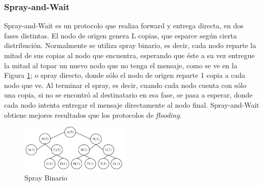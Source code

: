 \subsubsection{Spray-and-Wait}
Spray-and-Wait\cite{sandw} es un protocolo que realiza forward y entrega directa, en dos fases distintas. El nodo de origen genera L copias, que esparce según cierta distribución. Normalmente se utiliza spray binario, es decir, cada nodo reparte la mitad de sus copias al nodo que encuentra, esperando que éste a su vez entregue la mitad al topar un nuevo nodo que no tenga el mensaje, como se ve en la Figura \ref{fig:hpa}; o spray directo, donde sólo el nodo de origen reparte 1 copia a cada nodo que ve. Al terminar el spray, es decir, cuando cada nodo cuenta con sólo una copia, si no se encontró al destinatario en esa fase, se pasa a esperar, donde cada nodo intenta entregar el mensaje directamente al nodo final.
Spray-and-Wait obtiene mejores resultados que los protocolos de \emph{flooding}.

\begin{figure}[h]
\centering
\includegraphics[width=200px]{HPA.png}
\caption{Spray Binario \cite{crhc}}
\label{fig:hpa}
\end{figure}